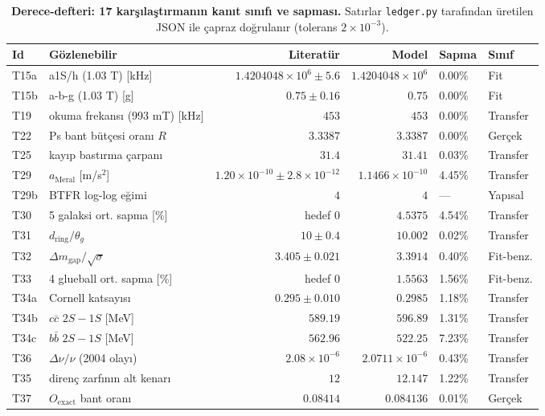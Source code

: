 \documentclass[12pt,a4paper]{article}
\begin{document}
\begin{table}[!htbp]
\centering\scriptsize
\setlength{\tabcolsep}{2.5pt}
\renewcommand{\arraystretch}{1.05}
\caption{\textbf{Derece-defteri: 17 karşılaştırmanın kanıt sınıfı ve sapması.}
Satırlar \texttt{ledger.py} tarafından üretilen JSON ile çapraz
doğrulanır (tolerans $2\times10^{-3}$).}
\label{tab:ledger}
\vspace{0.1cm}
\begin{tabularx}{\textwidth}{@{}lXrrll@{}}
\toprule
Id & Gözlenebilir & Literatür & Model & Sapma & Sınıf \\
\midrule
T15a & a1S/h (1.03 T) [kHz] & $1.4204048\times 10^{6}\pm 5.6$ & $1.4204048\times 10^{6}$ & 0.00\% & Fit \\
T15b & a-b-g (1.03 T) [g] & $0.75\pm 0.16$ & $0.75$ & 0.00\% & Fit \\
T19 & okuma frekansı (993 mT) [kHz] & $453$ & $453$ & 0.00\% & Transfer \\
T22 & Ps bant bütçesi oranı $R$ & $3.3387$ & $3.3387$ & 0.00\% & Gerçek \\
T25 & kayıp bastırma çarpanı & $31.4$ & $31.41$ & 0.03\% & Transfer \\
T29 & $a_{\mathrm{Meral}}$ [m/s$^2$] & $1.20\times 10^{-10}\pm 2.8\times 10^{-12}$ & $1.1466\times 10^{-10}$ & 4.45\% & Transfer \\
T29b & BTFR log-log eğimi & $4$ & $4$ & --- & Yapısal \\
T30 & 5 galaksi ort. sapma [\%] & hedef 0 & $4.5375$ & 4.54\% & Transfer \\
T31 & $d_{\mathrm{ring}}/\theta_g$ & $10\pm 0.4$ & $10.002$ & 0.02\% & Transfer \\
T32 & $\Delta m_{\mathrm{gap}}/\sqrt{\sigma}$ & $3.405\pm 0.021$ & $3.3914$ & 0.40\% & Fit-benz. \\
T33 & 4 glueball ort. sapma [\%] & hedef 0 & $1.5563$ & 1.56\% & Fit-benz. \\
T34a & Cornell katsayısı & $0.295\pm 0.010$ & $0.2985$ & 1.18\% & Transfer \\
T34b & $c\bar{c}$ $2S-1S$ [MeV] & $589.19$ & $596.89$ & 1.31\% & Transfer \\
T34c & $b\bar{b}$ $2S-1S$ [MeV] & $562.96$ & $522.25$ & 7.23\% & Transfer \\
T36 & $\Delta\nu/\nu$ (2004 olayı) & $2.08\times 10^{-6}$ & $2.0711\times 10^{-6}$ & 0.43\% & Transfer \\
T35 & direnç zarfının alt kenarı & $12$ & $12.147$ & 1.22\% & Transfer \\
T37 & $O_{\mathrm{exact}}$ bant oranı & $0.08414$ & $0.084136$ & 0.01\% & Gerçek \\
\bottomrule
\end{tabularx}
\end{table}
\end{document}
